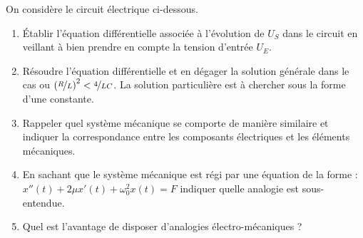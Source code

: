 \bexo

On considère le circuit électrique ci-dessous.

\begin{center}
\end{center}

\begin{enumerate}
	\item Établir l'équation différentielle associée à l'évolution de $U_S$ dans le circuit
		en veillant à bien prendre en compte la tension d'entrée $U_E$.
	\item Résoudre l'équation différentielle et en dégager la solution générale dans le cas
		ou $\left(\nicefrac{R}{L}\right)^2 < \nicefrac{4}{LC}$. La solution particulière est à
		chercher sous la forme d'une constante.
	\item Rappeler quel système mécanique se comporte de manière similaire et indiquer la
		correspondance entre les composants électriques et les éléments mécaniques.
	\item En sachant que le système mécanique est régi par une équation de la forme :
		$x''(t) + 2\mu x'(t) + \omega_0^2x(t) = F$ indiquer quelle analogie est sous-entendue.
	\item Quel est l'avantage de disposer d'analogies électro-mécaniques ?
\end{enumerate}
\eexo
